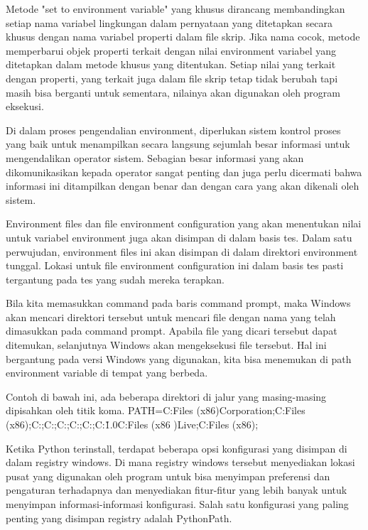 Metode "set to environment variable" yang khusus dirancang membandingkan setiap nama variabel lingkungan dalam pernyataan yang ditetapkan secara khusus dengan nama variabel properti dalam file skrip. Jika nama cocok, metode memperbarui objek properti terkait dengan nilai environment variabel yang ditetapkan dalam metode khusus yang ditentukan. Setiap nilai yang terkait dengan properti, yang terkait juga dalam file skrip tetap tidak berubah tapi masih bisa berganti untuk sementara, nilainya akan digunakan oleh program eksekusi. \cite{curtis2003overriding}

Di dalam proses pengendalian environment, diperlukan sistem kontrol proses yang baik untuk menampilkan secara langsung sejumlah besar informasi untuk mengendalikan operator sistem. Sebagian besar informasi yang akan dikomunikasikan kepada operator sangat penting dan juga perlu dicermati bahwa informasi ini ditampilkan dengan benar dan dengan cara yang akan dikenali oleh sistem. \cite{kilgore1997directly}

Environment files dan file environment configuration yang akan menentukan nilai untuk variabel environment juga akan disimpan di dalam basis tes. Dalam satu perwujudan, environment files ini akan disimpan di dalam direktori environment tunggal. Lokasi untuk file environment configuration ini dalam basis tes pasti tergantung pada tes yang sudah mereka terapkan. \cite{janniro1997method}

Bila kita memasukkan command pada baris command prompt, maka Windows akan mencari direktori tersebut untuk mencari file dengan nama yang telah dimasukkan pada command prompt. Apabila file yang dicari tersebut dapat ditemukan, selanjutnya Windows akan mengeksekusi file tersebut. Hal ini bergantung pada versi Windows yang digunakan, kita bisa menemukan di path environment variable di tempat yang berbeda. \cite{koster2002featflow}

Contoh di bawah ini, ada beberapa direktori di jalur yang masing-masing dipisahkan oleh titik koma.
PATH=C:\Program Files (x86)\NVIDIA Corporation\PhysX\Common;C:\Program Files (x86)\WinSCP;C:\Perl\site\bin;C:\Perl\bin;C:\WINDOWS{};C:\WINDOWS;C:\WINDOWS {}\Wbem;C:\WINDOWS{}\WindowsPowerShell\v1.0\;C:\Program Files (x86 )\Windows Live\Shared;C:\Program Files (x86)\FAHClient;

Ketika Python terinstall, terdapat beberapa opsi konfigurasi yang disimpan di dalam registry windows. Di mana registry windows tersebut menyediakan lokasi pusat yang digunakan oleh program untuk bisa menyimpan preferensi dan pengaturan terhadapnya dan menyediakan fitur-fitur yang lebih banyak untuk menyimpan informasi-informasi konfigurasi. Salah satu konfigurasi yang paling penting yang disimpan registry adalah PythonPath.\cite{hammond2000python}

